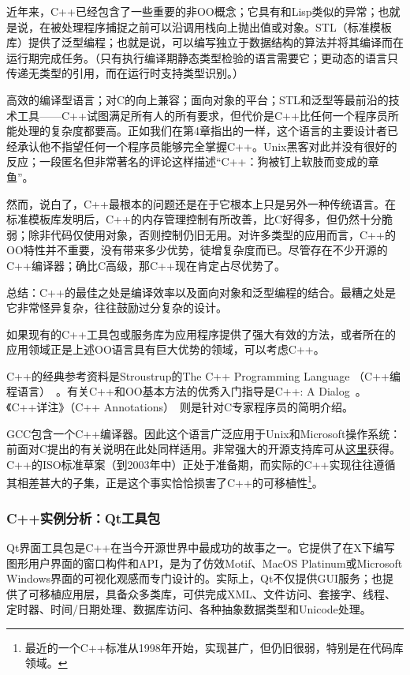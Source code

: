 \documentclass[12pt,oneside]{ctexbook}
\begin{document}
\begin{common-format}
近年来，C++已经包含了一些重要的非OO概念；它具有和Lisp类似的异常；也就是说，在被处理程序捕捉之前可以沿调用栈向上抛出值或对象。STL（标准模板库）提供了泛型编程；也就是说，可以编写独立于数据结构的算法并将其编译而在运行期完成任务。（只有执行编译期静态类型检验的语言需要它；更动态的语言只传递无类型的引用，而在运行时支持类型识别。）

高效的编译型语言；对C的向上兼容；面向对象的平台；STL和泛型等最前沿的技术工具——C++试图满足所有人的所有要求，但代价是C++比任何一个程序员所能处理的复杂度都要高。正如我们在第4章指出的一样，这个语言的主要设计者已经承认他不指望任何一个程序员能够完全掌握C++。Unix黑客对此并没有很好的反应；一段匿名但非常著名的评论这样描述“C++：狗被钉上软肢而变成的章鱼”。

然而，说白了，C++最根本的问题还是在于它根本上只是另外一种传统语言。在标准模板库发明后，C++的内存管理控制有所改善，比C好得多，但仍然十分脆弱；除非代码仅使用对象，否则控制仍旧无用。对许多类型的应用而言，C++的OO特性并不重要，没有带来多少优势，徒增复杂度而已。尽管存在不少开源的C++编译器；确比C高级，那C++现在肯定占尽优势了。

总结：C++的最佳之处是编译效率以及面向对象和泛型编程的结合。最糟之处是它非常怪异复杂，往往鼓励过分复杂的设计。

如果现有的C++工具包或服务库为应用程序提供了强大有效的方法，或者所在的应用领域正是上述OO语言具有巨大优势的领域，可以考虑C++。

C++的经典参考资料是Stroustrup的The C++ Programming Language （C++编程语言）~\cite{Stroustrup}。有关C++和OO基本方法的优秀入门指导是C++: A Dialog~\cite{Heller}。《C++详注》（C++ Annotations）~\cite{Brokken}则是针对C专家程序员的简明介绍。

GCC包含一个C++编译器。因此这个语言广泛应用于Unix和Microsoft操作系统：前面对C提出的有关说明在此处同样适用。非常强大的开源支持库可从\href{http://www.boost.org/}{这里}获得。C++的ISO标准草案（到2003年中）正处于准备期，而实际的C++实现往往遵循其相差甚大的子集，正是这个事实恰恰损害了C++的可移植性\footnote{最近的一个C++标准从1998年开始，实现甚广，但仍旧很弱，特别是在代码库领域。}。

\subsubsection{C++实例分析：Qt工具包}
Qt界面工具包是C++在当今开源世界中最成功的故事之一。它提供了在X下编写图形用户界面的窗口构件和API，是为了仿效Motif、MacOS Platinum或Microsoft Windows界面的可视化观感而专门设计的。实际上，Qt不仅提供GUI服务；也提供了可移植应用层，具备众多类库，可供完成XML、文件访问、套接字、线程、定时器、时间/日期处理、数据库访问、各种抽象数据类型和Unicode处理。


\end{common-format}
\end{document}
